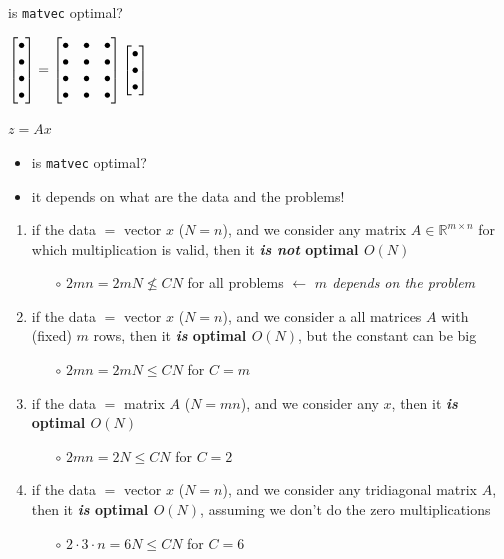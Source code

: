 \documentclass[10pt,
               svgnames,
               hyperref={colorlinks,citecolor=DeepPink4,linkcolor=FireBrick,urlcolor=Maroon},
               usepdftitle=false]{beamer}
\newcommand{\RR}{\mathbb{R}}
\newcommand{\ftt}[1]{{\color{blue} \texttt{#1}}}
\begin{document}
\begin{frame}{is \texttt{matvec} optimal?}

\hfill
{\scriptsize $\displaystyle \begin{bmatrix} \bullet \\ \bullet \\ \bullet \\ \bullet \end{bmatrix} = \begin{bmatrix} \bullet & \bullet & \bullet \\ \bullet & \bullet & \bullet \\ \bullet & \bullet & \bullet \\ \bullet & \bullet & \bullet \end{bmatrix} \begin{bmatrix} \bullet \\ \bullet \\ \bullet \end{bmatrix}$}

\vspace{2mm}

\hfill
{\scriptsize $z = A x$} \hspace{17mm}

\vspace{-8mm}
\begin{itemize}
\item is \ftt{matvec} optimal?
\item it depends on what are the \alert{data} and the \alert{problems}!
\end{itemize}

\begin{enumerate}
\item<2->[1.] if the \alert{data $=$ vector $x$} ($N=n$), and we consider \alert{any matrix $A\in\RR^{m\times n}$ for which multiplication is valid}, then it \textbf{\emph{is not} optimal $O(N)$}
    \begin{itemize}
    \item[$\circ$] $2mn = 2m N \nleq C N$ for all problems \hfill $\gets$ \emph{$m$ depends on the problem}
    \end{itemize}
\item<3->[2.] if the \alert{data $=$ vector $x$} ($N=n$), and we consider a \alert{all matrices $A$ with (fixed) $m$ rows}, then it \textbf{\emph{is} optimal $O(N)$}, but the constant can be big
    \begin{itemize}
    \item[$\circ$] $2mn = 2m N \leq C N$ for $C=m$
    \end{itemize}
\item<4->[3.] if the \alert{data $=$ matrix $A$} ($N=mn$), and we consider \alert{any $x$}, then it \textbf{\emph{is} optimal $O(N)$}
    \begin{itemize}
    \item[$\circ$] $2mn = 2 N \leq C N$ for $C=2$
    \end{itemize}
\item<5>[4.] if the \alert{data $=$ vector $x$} ($N=n$), and we consider \alert{any tridiagonal matrix $A$}, then it \textbf{\emph{is} optimal $O(N)$}, assuming we don't do the zero multiplications
    \begin{itemize}
    \item[$\circ$] $2\cdot 3\cdot n = 6 N \leq C N$ for $C=6$
    \end{itemize}
\end{enumerate}
\end{frame}
\end{document}
